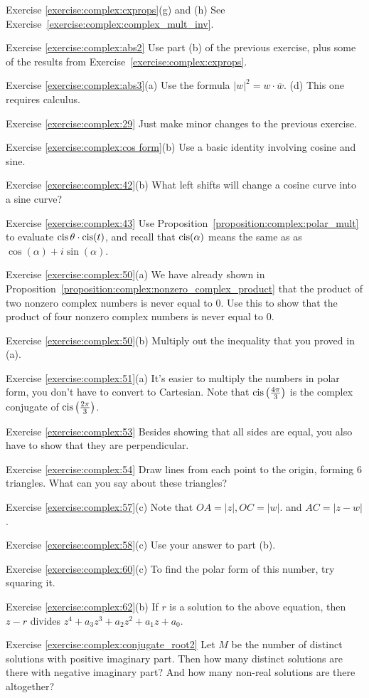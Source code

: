 \noindent Exercise \ref{exercise:complex:cxprops}(g) and (h)
See Exercise~\ref{exercise:complex:complex_mult_inv}.


\noindent Exercise \ref{exercise:complex:abs2}
Use part (b) of the previous exercise, plus
some of the results from Exercise~\ref{exercise:complex:cxprops}.


\noindent Exercise \ref{exercise:complex:abs3}(a)
Use the formula $|w|^2 = w\cdot \overline{w}$.  (d) This one requires calculus.

\noindent Exercise \ref{exercise:complex:29}
Just make minor changes to the previous exercise.

\noindent Exercise \ref{exercise:complex:cos form}(b)
Use a basic identity involving cosine and sine.

\noindent Exercise \ref{exercise:complex:42}(b)
What left shifts will change a cosine curve into a sine curve?

\noindent Exercise \ref{exercise:complex:43}
 Use Proposition~\ref{proposition:complex:polar_mult} to evaluate $\operatorname{cis}\theta \cdot \operatorname{cis}( t)$, and recall that $\operatorname{cis}(\alpha)$ means the same as as $\cos(\alpha) + i \sin(\alpha)$.


\noindent Exercise \ref{exercise:complex:50}(a)
We have already shown  in Proposition~\ref{proposition:complex:nonzero_complex_product} that the product of two nonzero complex numbers is never equal to 0. Use this to show that the product of four nonzero complex numbers is never equal to 0.


\noindent Exercise \ref{exercise:complex:50}(b)
Multiply out the inequality that you proved in (a).

\noindent Exercise \ref{exercise:complex:51}(a)
It's easier to multiply the numbers in polar form, you don't have to convert to Cartesian.  Note that $\operatorname{cis}\left(\frac{4\pi}{3}\right)$ is the complex conjugate of $\operatorname{cis}\left(\frac{2\pi}{3}\right)$.

\noindent Exercise \ref{exercise:complex:53}
Besides showing that all sides are equal, you also have to show that they are perpendicular.

\noindent Exercise \ref{exercise:complex:54}
Draw lines from each point to the origin, forming 6 triangles. What can you say about these triangles?

\noindent Exercise \ref{exercise:complex:57}(c)
Note that $OA = |z|, OC = |w|.$ and $AC = |z-w|$.

\noindent Exercise \ref{exercise:complex:58}(c)
Use your answer to part (b).

\noindent Exercise \ref{exercise:complex:60}(c)
 To find the polar form of this number, try squaring it.

\noindent Exercise \ref{exercise:complex:62}(b)
If $r$ is a solution to the above equation, then $z-r$ divides  $z^4 + a_{3}z^{3} + a_{2} z^{2}+ a_1 z  + a_0$.

\noindent Exercise \ref{exercise:complex:conjugate_root2}
 Let $M$ be the number of distinct solutions with positive imaginary part. Then how many distinct solutions are there with negative imaginary part? And how many non-real solutions are there altogether?

